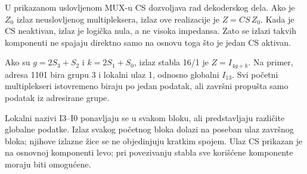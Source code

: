 
U prikazanom uslovljenom MUX-u CS dozvoljava rad dekoderskog dela. Ako je \(Z_0\) izlaz neuslovljenog multipleksera, izlaz ove realizacije je \(Z=CS\,Z_0\). Kada je CS neaktivan, izlaz je logička nula, a ne visoka impedansa. Zato se izlazi takvih komponenti ne spajaju direktno samo na osnovu toga što je jedan CS aktivan.

Ako su \(g=2S_3+S_2\) i \(k=2S_1+S_0\), izlaz stabla 16/1 je \(Z=I_{4g+k}\). Na primer, adresa 1101 bira grupu 3 i lokalni ulaz 1, odnosno globalni \(I_{13}\). Svi početni multiplekseri istovremeno biraju po jedan podatak, ali završni propušta samo podatak iz adresirane grupe.

Lokalni nazivi I3--I0 ponavljaju se u svakom bloku, ali predstavljaju različite globalne podatke. Izlaz svakog početnog bloka dolazi na poseban ulaz završnog bloka; njihove izlazne žice se ne objedinjuju kratkim spojem. Ulaz CS prikazan je na osnovnoj komponenti levo; pri povezivanju stabla sve korišćene komponente moraju biti omogućene.
